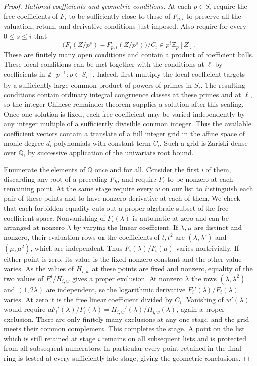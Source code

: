 \begin{proof}
    \emph{Rational coefficients and geometric conditions.}
    At each $p \in S_i$ require the free coefficients of $F_i$ to be sufficiently close to those of $F_{p, i}$ to preserve all the valuation, return, and derivative conditions just imposed.
    Also require for every $0 \le s \le i$ that
    \[
        \bigl(F_i(Z/p^s) - F_{p, i}(Z/p^s)\bigr) / C_i
            \in p^i \mathbb{Z}_p[Z].
    \]
    These are finitely many open conditions and contain a product of coefficient balls.
    These local conditions can be met together with the conditions at $\ell$ by coefficients in $\mathbb{Z}[p^{-1} : p \in S_i]$.
    Indeed, first multiply the local coefficient targets by a sufficiently large common product of powers of primes in $S_i$.
    The resulting conditions contain ordinary integral congruence classes at these primes and at $\ell$, so the integer Chinese remainder theorem supplies a solution after this scaling.
    Once one solution is fixed, each free coefficient may be varied independently by any integer multiple of a sufficiently divisible common integer.
    Thus the available coefficient vectors contain a translate of a full integer grid in the affine space of monic degree-$d_i$ polynomials with constant term $C_i$.
    Such a grid is Zariski dense over $\overline{\mathbb{Q}}$, by successive application of the univariate root bound.

    Enumerate the elements of $\overline{\mathbb{Q}}$ once and for all.
    Consider the first $i$ of them, discarding any root of a preceding $F_h$, and require $F_i$ to be nonzero at each remaining point.
    At the same stage require every $w$ on our list to distinguish each pair of these points and to have nonzero derivative at each of them.
    We check that each forbidden equality cuts out a proper algebraic subset of the free coefficient space.
    Nonvanishing of $F_i(\lambda)$ is automatic at zero and can be arranged at nonzero $\lambda$ by varying the linear coefficient.
    If $\lambda, \mu$ are distinct and nonzero, their evaluation rows on the coefficients of $t, t^2$ are $(\lambda, \lambda^2)$ and $(\mu, \mu^2)$, which are independent.
    Thus $F_i(\lambda)/F_i(\mu)$ varies nontrivially.
    If either point is zero, its value is the fixed nonzero constant and the other value varies.
    As the values of $H_{i, w}$ at these points are fixed and nonzero, equality of the two values of $F_i^a/H_{i, w}$ gives a proper exclusion.
    At nonzero $\lambda$ the rows $(\lambda, \lambda^2)$ and $(1, 2\lambda)$ are independent, so the logarithmic derivative $F_i'(\lambda)/F_i(\lambda)$ varies.
    At zero it is the free linear coefficient divided by $C_i$.
    Vanishing of $w'(\lambda)$ would require $aF_i'(\lambda)/F_i(\lambda) = H_{i, w}'(\lambda)/H_{i, w}(\lambda)$, again a proper exclusion.
    There are only finitely many exclusions at any one stage, and the grid meets their common complement.
    This completes the stage.
    A point on the list which is still retained at stage $i$ remains on all subsequent lists and is protected from all subsequent numerators.
    In particular every point retained in the final ring is tested at every sufficiently late stage, giving the geometric conclusions.


\end{proof}
